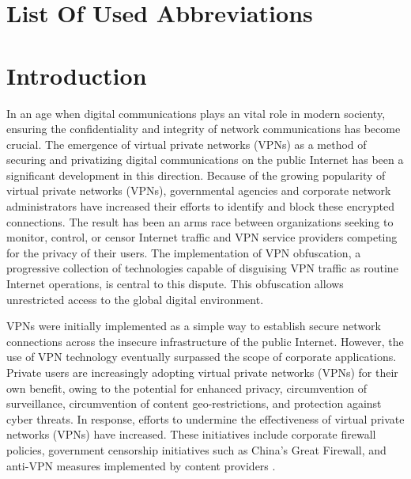 \documentclass[12pt, fleqn, a4paper]{article}
\begin{document}
%
\setcounter{page}{5}


\renewcommand{\cfttoctitlefont}{\hfill\Large\bf}
\renewcommand{\cftaftertoctitle}{\hfill\hfill}
\let\oldcontentsname\contentsname
\renewcommand{\contentsname}{ \HeaderSize \hfill \HeaderSize \oldcontentsname}
\renewcommand{\cftsecfont}{\mdseries\scshape\sffamily}
\renewcommand{\cftsecpagefont}{\mdseries\scshape\sffamily}


\setlength\cftbeforesecskip{1pt}

\tableofcontents
\newpage

\section*{\centering List Of Used Abbreviations}
\begin{adjustwidth}{113pt}{43pt}
	\begin{sortedlist}
	\end{sortedlist}
\end{adjustwidth}
\section*{\centering Introduction}
In an age when digital communications plays an vital role in modern socienty, ensuring the confidentiality and integrity of network communications has become crucial. The emergence of virtual private networks (VPNs) as a method of securing and privatizing digital communications on the public Internet has been a significant development in this direction. Because of the growing popularity of virtual private networks (VPNs), governmental agencies and corporate network administrators have increased their efforts to identify and block these encrypted connections. The result has been an arms race between organizations seeking to monitor, control, or censor Internet traffic and VPN service providers competing for the privacy of their users. The implementation of VPN obfuscation, a progressive collection of technologies capable of disguising VPN traffic as routine Internet operations, is central to this dispute. This obfuscation allows unrestricted access to the global digital environment.

VPNs were initially implemented as a simple way to establish secure network connections across the insecure infrastructure of the public Internet. However, the use of VPN technology eventually surpassed the scope of corporate applications. Private users are increasingly adopting virtual private networks (VPNs) for their own benefit, owing to the potential for enhanced privacy, circumvention of surveillance, circumvention of content geo-restrictions, and protection against cyber threats. In response, efforts to undermine the effectiveness of virtual private networks (VPNs) have increased. These initiatives include corporate firewall policies, government censorship initiatives such as China's Great Firewall, and anti-VPN measures implemented by content providers \citep{DPL}.
\end{document}
